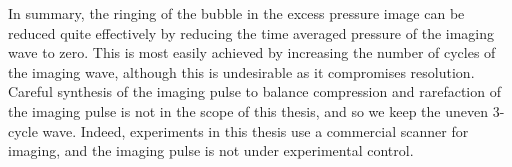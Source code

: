 In summary,
the ringing of the bubble in the excess pressure image can be reduced quite effectively 
by  reducing the time averaged pressure of the imaging wave to zero.
This is most easily achieved by increasing the number of cycles of the imaging wave,
although this is undesirable as it compromises resolution.
Careful synthesis of the imaging pulse to balance compression and rarefaction of the imaging pulse is not in the scope of this thesis,
and so we keep the uneven 3-cycle wave.
Indeed,  experiments in this thesis use a commercial scanner for imaging,
and the imaging pulse is not under experimental control.















